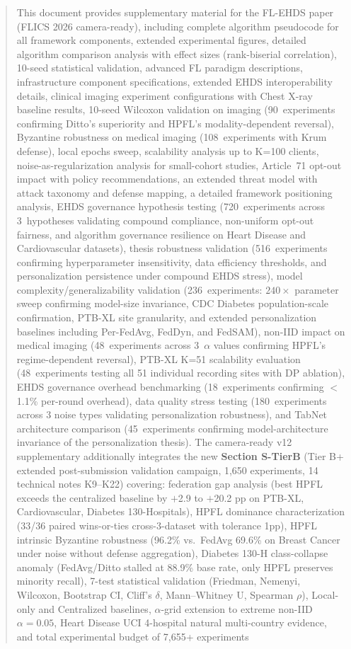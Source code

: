 \documentclass[conference]{IEEEtran}
\begin{document}
\begin{abstract}
This document provides supplementary material for the FL-EHDS paper (FLICS 2026 camera-ready), including complete algorithm pseudocode for all framework components, extended experimental figures, detailed algorithm comparison analysis with effect sizes (rank-biserial correlation), 10-seed statistical validation, advanced FL paradigm descriptions, infrastructure component specifications, extended EHDS interoperability details, clinical imaging experiment configurations with Chest X-ray baseline results, 10-seed Wilcoxon validation on imaging (90~experiments confirming Ditto's superiority and HPFL's modality-dependent reversal), Byzantine robustness on medical imaging (108~experiments with Krum defense), local epochs sweep, scalability analysis up to K=100 clients, noise-as-regularization analysis for small-cohort studies, Article~71 opt-out impact with policy recommendations, an extended threat model with attack taxonomy and defense mapping, a detailed framework positioning analysis, EHDS governance hypothesis testing (720~experiments across 3~hypotheses validating compound compliance, non-uniform opt-out fairness, and algorithm governance resilience on Heart Disease and Cardiovascular datasets), thesis robustness validation (516~experiments confirming hyperparameter insensitivity, data efficiency thresholds, and personalization persistence under compound EHDS stress), model complexity/generalizability validation (236~experiments: $240\times$ parameter sweep confirming model-size invariance, CDC Diabetes population-scale confirmation, PTB-XL site granularity, and extended personalization baselines including Per-FedAvg, FedDyn, and FedSAM), non-IID impact on medical imaging (48~experiments across 3~$\alpha$ values confirming HPFL's regime-dependent reversal), PTB-XL K=51 scalability evaluation (48~experiments testing all 51 individual recording sites with DP ablation), EHDS governance overhead benchmarking (18~experiments confirming $<$1.1\% per-round overhead), data quality stress testing (180~experiments across 3 noise types validating personalization robustness), and TabNet architecture comparison (45~experiments confirming model-architecture invariance of the personalization thesis). The camera-ready v12 supplementary additionally integrates the new \textbf{Section S-TierB} (Tier B+ extended post-submission validation campaign, 1,650 experiments, 14 technical notes K9--K22) covering: federation gap analysis (best HPFL exceeds the centralized baseline by $+$2.9 to $+$20.2 pp on PTB-XL, Cardiovascular, Diabetes 130-Hospitals), HPFL dominance characterization (33/36 paired wins-or-ties cross-3-dataset with tolerance 1pp), HPFL intrinsic Byzantine robustness (96.2\% vs.\ FedAvg 69.6\% on Breast Cancer under noise without defense aggregation), Diabetes 130-H class-collapse anomaly (FedAvg/Ditto stalled at 88.9\% base rate, only HPFL preserves minority recall), 7-test statistical validation (Friedman, Nemenyi, Wilcoxon, Bootstrap CI, Cliff's $\delta$, Mann--Whitney U, Spearman $\rho$), Local-only and Centralized baselines, $\alpha$-grid extension to extreme non-IID $\alpha{=}0.05$, Heart Disease UCI 4-hospital natural multi-country evidence, and total experimental budget of 7{,}655+ experiments 
\end{abstract}
\end{document}
